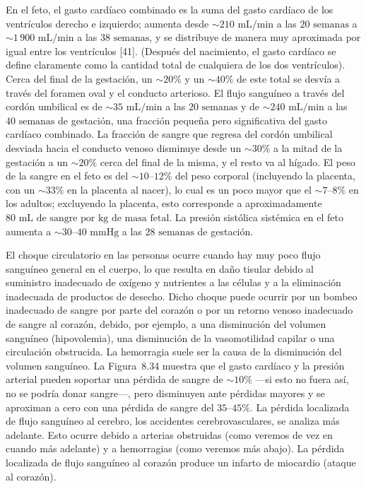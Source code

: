 \documentclass[12pt]{book}
\begin{document}
En el feto, el gasto cardíaco combinado es la suma del gasto cardíaco de los ventrículos derecho e izquierdo; aumenta desde ${\sim}210\text{ mL/min}$ a las $20\text{ semanas}$ a ${\sim}1\,900\text{ mL/min}$ a las $38\text{ semanas}$, y se distribuye de manera muy aproximada por igual entre los ventrículos [41]. (Después del nacimiento, el gasto cardíaco se define claramente como la cantidad total de cualquiera de los dos ventrículos). Cerca del final de la gestación, un ${\sim}20\%$ y un ${\sim}40\%$ de este total se desvía a través del foramen oval y el conducto arterioso. El flujo sanguíneo a través del cordón umbilical es de ${\sim}35\text{ mL/min}$ a las $20\text{ semanas}$ y de ${\sim}240\text{ mL/min}$ a las $40\text{ semanas}$ de gestación, una fracción pequeña pero significativa del gasto cardíaco combinado. La fracción de sangre que regresa del cordón umbilical desviada hacia el conducto venoso disminuye desde un ${\sim}30\%$ a la mitad de la gestación a un ${\sim}20\%$ cerca del final de la misma, y el resto va al hígado. El peso de la sangre en el feto es del ${\sim}10\text{--}12\%$ del peso corporal (incluyendo la placenta, con un ${\sim}33\%$ en la placenta al nacer), lo cual es un poco mayor que el ${\sim}7\text{--}8\%$ en los adultos; excluyendo la placenta, esto corresponde a aproximadamente $80\text{ mL de sangre por kg de masa fetal}$. La presión sistólica sistémica en el feto aumenta a ${\sim}30\text{--}40\text{ mmHg}$ a las $28\text{ semanas}$ de gestación.

El choque circulatorio en las personas ocurre cuando hay muy poco flujo sanguíneo general en el cuerpo, lo que resulta en daño tisular debido al suministro inadecuado de oxígeno y nutrientes a las células y a la eliminación inadecuada de productos de desecho. Dicho choque puede ocurrir por un bombeo inadecuado de sangre por parte del corazón o por un retorno venoso inadecuado de sangre al corazón, debido, por ejemplo, a una disminución del volumen sanguíneo (hipovolemia), una disminución de la vasomotilidad capilar o una circulación obstrucida. La hemorragia suele ser la causa de la disminución del volumen sanguíneo. La Figura~8.34 muestra que el gasto cardíaco y la presión arterial pueden soportar una pérdida de sangre de ${\sim}10\%$ ---si esto no fuera así, no se podría donar sangre---, pero disminuyen ante pérdidas mayores y se aproximan a cero con una pérdida de sangre del $35\text{--}45\%$. La pérdida localizada de flujo sanguíneo al cerebro, los accidentes cerebrovasculares, se analiza más adelante. Esto ocurre debido a arterias obstruidas (como veremos de vez en cuando más adelante) y a hemorragias (como veremos más abajo). La pérdida localizada de flujo sanguíneo al corazón produce un infarto de miocardio (ataque al corazón).
\end{document}
